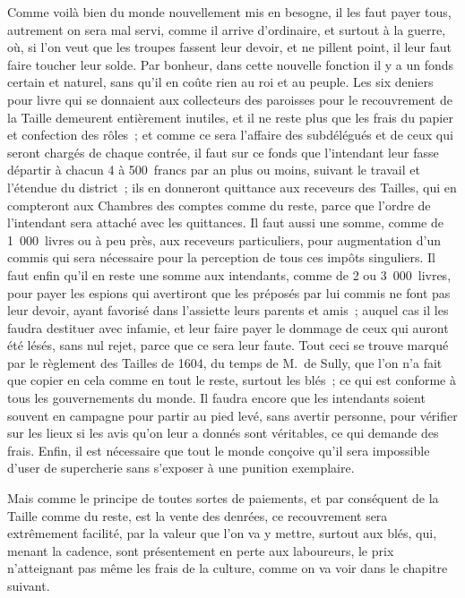 \documentclass[french,twoside]{book} %
\begin{document}
Comme voilà bien du monde nouvellement mis en besogne, il les faut payer tous, autrement on sera mal servi, comme il arrive d’ordinaire, et surtout à la guerre, où, si l’on veut que les troupes fassent leur devoir, et ne pillent point, il leur faut faire toucher leur solde. Par bonheur, dans cette nouvelle fonction il y a un fonds certain et naturel, sans qu’il en coûte rien au roi et au peuple. Les six deniers pour livre qui se donnaient aux collecteurs des paroisses pour le recouvrement de la Taille demeurent entièrement inutiles, et il ne reste plus que les frais du papier et confection des rôles ; et comme ce sera l’affaire des subdélégués et de ceux qui seront chargés de chaque contrée, il faut sur ce fonds que l’intendant leur fasse départir à chacun 4 à 500 francs par an plus ou moins, suivant le travail et l’étendue du district ; ils en donneront quittance aux receveurs des Tailles, qui en compteront aux Chambres des comptes comme du reste, parce que l’ordre de l’intendant sera attaché avec les quittances. Il faut aussi une somme, comme de 1 000 livres ou à peu près, aux receveurs particuliers, pour augmentation d’un commis qui sera nécessaire pour la perception de tous ces impôts singuliers. Il faut enfin qu’il en reste une somme aux intendants, comme de 2 ou 3 000 livres, pour payer les espions qui avertiront que les préposés par lui commis ne font pas leur devoir, ayant favorisé dans l’assiette leurs parents et amis ; auquel cas il les faudra destituer avec infamie, et leur faire payer le dommage de ceux qui auront été lésés, sans nul rejet, parce que ce sera leur faute. Tout ceci se trouve marqué par le règlement des Tailles de 1604, du temps de M. de Sully, que l’on n’a fait que copier en cela comme en tout le reste, surtout les blés ; ce qui est conforme à tous les gouvernements du monde. Il faudra encore que les intendants soient souvent en campagne pour partir au pied levé, sans avertir personne, pour vérifier sur les lieux si les avis qu’on leur a donnés sont véritables, ce qui demande des frais. Enfin, il est nécessaire que tout le monde conçoive qu’il sera impossible d’user de supercherie sans s’exposer à une punition exemplaire.\par
Mais comme le principe de toutes sortes de paiements, et par conséquent de la Taille comme du reste, est la vente des denrées, ce recouvrement sera extrêmement facilité, par la valeur que l’on va y mettre, surtout aux blés, qui, menant la cadence, sont présentement en perte aux laboureurs, le prix n’atteignant pas même les frais de la culture, comme on va voir dans le chapitre suivant.
\end{document}
